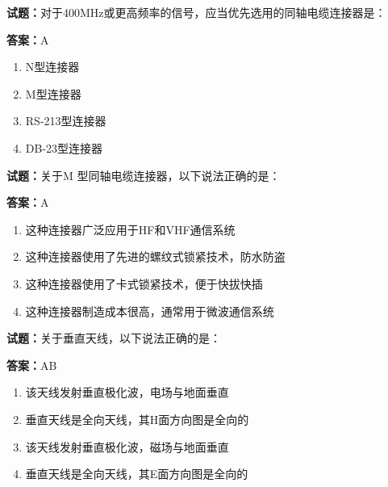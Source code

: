 \documentclass{ctexbook}
\begin{document}




\vspace{1em}

\textbf{试题：}对于400MHz或更高频率的信号，应当优先选用的同轴电缆连接器是： 

\textbf{答案：}A 

\begin{enumerate}[leftmargin=3em]
  \item N型连接器 

  \item M型连接器 

  \item RS-213型连接器 

  \item DB-23型连接器 

\end{enumerate}





\vspace{1em}

\textbf{试题：}关于M 型同轴电缆连接器，以下说法正确的是： 

\textbf{答案：}A 

\begin{enumerate}[leftmargin=3em]
  \item 这种连接器广泛应用于HF和VHF通信系统 

  \item 这种连接器使用了先进的螺纹式锁紧技术，防水防盗 

  \item 这种连接器使用了卡式锁紧技术，便于快拔快插 

  \item 这种连接器制造成本很高，通常用于微波通信系统 

\end{enumerate}





\vspace{1em}

\textbf{试题：}关于垂直天线，以下说法正确的是： 

\textbf{答案：}AB 

\begin{enumerate}[leftmargin=3em]
  \item 该天线发射垂直极化波，电场与地面垂直 

  \item 垂直天线是全向天线，其H面方向图是全向的 

  \item 该天线发射垂直极化波，磁场与地面垂直 

  \item 垂直天线是全向天线，其E面方向图是全向的 

\end{enumerate}
\end{document}
